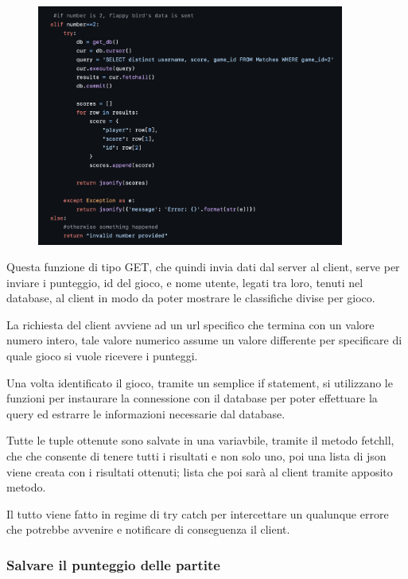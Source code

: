 \documentclass{article}
\begin{document}
\begin{figure}[H]
    \centering
    \includegraphics[width=0.9\textwidth]{images/invio_classifica2.png}
\end{figure}
Questa funzione di tipo GET, che quindi invia dati dal server al client, serve per inviare i punteggio, id del gioco, e nome utente, legati tra loro, tenuti nel database, al client in modo da poter mostrare le classifiche divise per gioco.

La richiesta del client avviene ad un url specifico che termina con un valore numero intero, tale valore numerico assume un valore differente per specificare di quale gioco si vuole ricevere i punteggi.

Una volta identificato il gioco, tramite un semplice if statement, si utilizzano le funzioni per instaurare la connessione con il database per poter effettuare la query ed estrarre le informazioni necessarie dal database.

Tutte le tuple ottenute sono salvate in una variavbile, tramite il metodo fetchll, che che consente di tenere tutti i risultati e non solo uno, poi una lista di json viene creata con i risultati ottenuti; lista che poi sarà al client tramite apposito metodo.

Il tutto viene fatto in regime di try catch per intercettare un qualunque errore che potrebbe avvenire e notificare di conseguenza il client.

\subsubsection{Salvare il punteggio delle partite}
\end{document}
